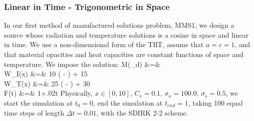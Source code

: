 \subsubsection{Linear in Time - Trigonometric in Space  }
In our first method of manufactured solutions problem, MMS1, we design a source whose radiation and temperature solutions is a cosine in space and  linear in time.
We use a non-dimensional form of the TRT, assume that $a=c=1$, and that material opacities and heat capacities are constant functions of space and temperature.
We impose the solution:
\beanum
M(\mu_d) &=&  \\
W_I(x) &=& 10 \cos\left(  -  \right) + 15\\
W_T(x) &=&  25 \cos\left(  -  \right) + 30\\
F(t) &=& 1+.02t \pep
\eeanum
Physically, $x\in[0,10]$, $C_v = 0.1$, $\sigma_a = 100.0$, $\sigma_s = 0.5$, we start the simulation at $t_0 = 0$, end the simulation at $t_{end}=1$, 
taking 100 equal time steps of length $\Delta t = 0.01$, with the SDIRK 2-2 scheme.  

